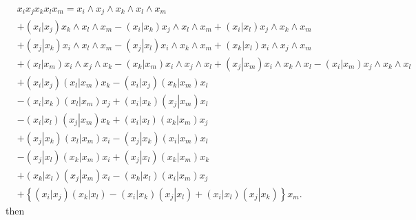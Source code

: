 \documentclass[aps, preprint]{revtex4}
\begin{document}
\begin{align} & x_{i} x_{j} x_{k} x_{l} x_{m} =x_{i} \wedge x_{j} \wedge x_{k} \wedge x_{l} \wedge x_{m} \nonumber  \\
 &  +\left (\left .x_{i}\right \vert x_{j}\right ) x_{k} \wedge x_{l} \wedge x_{m} -\left (\left .x_{i}\right \vert x_{k}\right ) x_{j} \wedge x_{l} \wedge x_{m} +\left (\left .x_{i}\right \vert x_{l}\right ) x_{j} \wedge x_{k} \wedge x_{m} \nonumber  \\
 &  +\left (\left .x_{j}\right \vert x_{k}\right ) x_{i} \wedge x_{l} \wedge x_{m} -\left (\left .x_{j}\right \vert x_{l}\right ) x_{i} \wedge x_{k} \wedge x_{m} +\left (\left .x_{k}\right \vert x_{l}\right ) x_{i} \wedge x_{j} \wedge x_{m} \nonumber  \\
 &  +\left (\left .x_{l}\right \vert x_{m}\right ) x_{i} \wedge x_{j} \wedge x_{k} -\left (\left .x_{k}\right \vert x_{m}\right ) x_{i} \wedge x_{j} \wedge x_{l} +\left (\left .x_{j}\right \vert x_{m}\right ) x_{i} \wedge x_{k} \wedge x_{l} -\left (\left .x_{i}\right \vert x_{m}\right ) x_{j} \wedge x_{k} \wedge x_{l} \nonumber  \\
 &  +\left (\left .x_{i}\right \vert x_{j}\right ) \left (\left .x_{l}\right \vert x_{m}\right ) x_{k} -\left (\left .x_{i}\right \vert x_{j}\right ) \left (\left .x_{k}\right \vert x_{m}\right ) x_{l} \nonumber  \\
 &  -\left (\left .x_{i}\right \vert x_{k}\right ) \left (\left .x_{l}\right \vert x_{m}\right ) x_{j} +\left (\left .x_{i}\right \vert x_{k}\right ) \left (\left .x_{j}\right \vert x_{m}\right ) x_{l} \nonumber  \\
 &  -\left (\left .x_{i}\right \vert x_{l}\right ) \left (\left .x_{j}\right \vert x_{m}\right ) x_{k} +\left (\left .x_{i}\right \vert x_{l}\right ) \left (\left .x_{k}\right \vert x_{m}\right ) x_{j} \nonumber  \\
 &  +\left (\left .x_{j}\right \vert x_{k}\right ) \left (\left .x_{l}\right \vert x_{m}\right ) x_{i} -\left (\left .x_{j}\right \vert x_{k}\right ) \left (\left .x_{i}\right \vert x_{m}\right ) x_{l} \nonumber  \\
 &  -\left (\left .x_{j}\right \vert x_{l}\right ) \left (\left .x_{k}\right \vert x_{m}\right ) x_{i} +\left (\left .x_{j}\right \vert x_{l}\right ) \left (\left .x_{k}\right \vert x_{m}\right ) x_{k} \nonumber  \\
 &  +\left (\left .x_{k}\right \vert x_{l}\right ) \left (\left .x_{j}\right \vert x_{m}\right ) x_{i} -\left (\left .x_{k}\right \vert x_{l}\right ) \left (\left .x_{i}\right \vert x_{m}\right ) x_{j} \nonumber  \\
 &  +\left \{\left (\left .x_{i}\right \vert x_{j}\right ) \left (\left .x_{k}\right \vert x_{l}\right ) -\left (\left .x_{i}\right \vert x_{k}\right ) \left (\left .x_{j}\right \vert x_{l}\right ) +\left (\left .x_{i}\right \vert x_{l}\right ) \left (\left .x_{j}\right \vert x_{k}\right )\right \} x_{m}\text{.}\end{align}then
\end{document}
